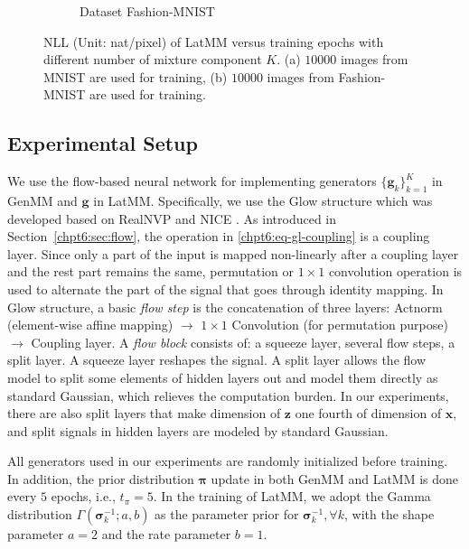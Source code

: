 \begin{figure}[!tp]
\begin{subfigure}{.4\textwidth}
    \caption{Dataset Fashion-MNIST}
    \label{fig-latmm-fsh-nll-curve}
  \end{subfigure}
  
  \caption{NLL (Unit: nat/pixel) of LatMM versus training epochs with different number of mixture component $K$. (a) $10000$ images from MNIST are used for training, (b) $10000$ images from Fashion-MNIST are used for training.}
  \label{fig:latmm-nll}
\end{figure}


\subsection{Experimental Setup}\label{sub:exp-setup}

We use the flow-based neural network for implementing generators $\{\bm{g}_k\}_{k=1}^{K}$ in GenMM and $\bm{g}$ in LatMM. Specifically, we use the Glow structure \cite{2018arXiv180703039K} which was developed based on RealNVP \cite{2016arXiv160508803D} and NICE \cite{DBLP:journals/corr/DinhKB14}. As introduced in Section~\ref{chpt6:sec:flow}, the operation in \eqref{chpt6:eq-gl-coupling} is a coupling
layer. Since only a part of the input is mapped non-linearly after a coupling
layer and the rest part remains the same, permutation \cite{2016arXiv160508803D} or $1\times 1$ convolution operation \cite{2018arXiv180703039K} is used to alternate the part of the signal that goes through identity mapping. In Glow structure, a basic \textit{flow step} is the concatenation of three layers: Actnorm (element-wise affine mapping)
$\rightarrow$ $1\times 1$ Convolution (for permutation purpose)
$\rightarrow$ Coupling layer. A \textit{flow block} consists of: a squeeze layer,
several flow steps, a split layer. A squeeze layer reshapes the
signal. A split layer allows the flow model to split some elements of hidden layers out and model them
directly as standard Gaussian, which relieves the computation burden. In our experiments, there are also split layers that make dimension of $\bm{z}$ one fourth of dimension of $\bm{x}$, and split signals in hidden layers are modeled by standard Gaussian. 

All generators used in our experiments are randomly initialized before training. 
In addition, the prior distribution $\bm{\pi}$ update in both GenMM and LatMM is done every $5$ epochs, {i.e.},  $t_{\pi} = 5$. In the training of LatMM, we adopt the Gamma distribution $\Gamma(\bm{\sigma}_k^{-1}; a, b)$ as the parameter prior for $\bm{\sigma}_k^{-1}, \forall k$, with the shape parameter $a=2$ and the rate parameter $b = 1$.

